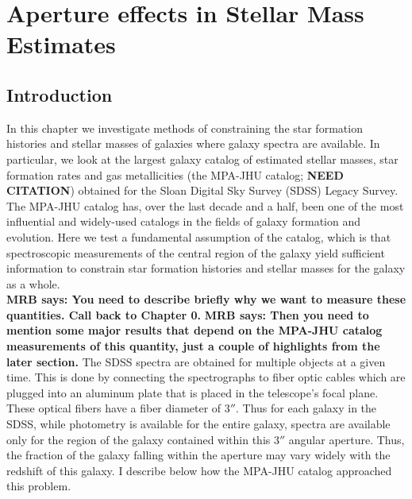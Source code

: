 \chapter{Aperture effects in Stellar Mass Estimates}

\label{ch:acm}
\newpage

\section{Introduction}

In this chapter we investigate methods of constraining the star formation histories and stellar masses of galaxies where galaxy spectra are available. In particular, we look at the largest galaxy catalog of estimated stellar masses, star formation rates and gas metallicities (the MPA-JHU catalog; {\bf NEED CITATION}) obtained for the Sloan Digital Sky Survey (SDSS) Legacy Survey. The MPA-JHU catalog has, over the last decade and a half, been one of the most influential and widely-used catalogs in the fields of galaxy formation and evolution. Here we test a fundamental assumption of the catalog, which is that spectroscopic measurements of the central region of the galaxy yield sufficient information to constrain star formation histories and stellar masses for the galaxy as a whole.\\
\textbf{MRB says: You need to describe briefly why we want to measure
these quantities. Call back to Chapter 0. }
{\bf MRB says: Then you need to mention some major results that depend
on the MPA-JHU catalog measurements of this quantity, just a couple of 
highlights from the later section. }
The SDSS spectra are obtained for multiple objects at a given time. This is done by connecting the spectrographs to fiber optic cables which are plugged into an aluminum plate that is placed in the telescope's focal plane. These optical fibers have a fiber diameter of $3''$. Thus for each galaxy in the SDSS, while photometry is available for the entire galaxy, spectra are available only for the region of the galaxy contained within this $3''$ angular aperture. Thus, the fraction of the galaxy falling within the aperture may vary widely with the redshift of this galaxy. I describe below how the MPA-JHU catalog approached this problem.\\
